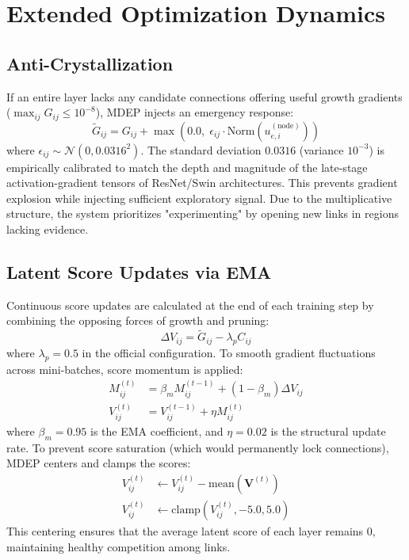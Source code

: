 \documentclass[letterpaper]{article} %
\begin{document}
\section{Extended Optimization Dynamics}
\subsection{Anti-Crystallization}\label{subsec:anti_crystal}

If an entire layer lacks any candidate connections offering useful growth gradients ($\max_{ij} G_{ij} \le 10^{-8}$), MDEP injects an emergency response:
\begin{equation}\label{eq:anti_crystal_eq}
    \tilde{G}_{ij} = G_{ij} + \max\!\left(0.0,\; \epsilon_{ij} \cdot \text{Norm}(u_{e,i}^{(\text{node})})\right)
\end{equation}
where $\epsilon_{ij} \sim \mathcal{N}(0, 0.0316^2)$. The standard deviation $0.0316$ (variance $10^{-3}$) is empirically calibrated to match the depth and magnitude of the late-stage activation-gradient tensors of ResNet/Swin architectures. This prevents gradient explosion while injecting sufficient exploratory signal. Due to the multiplicative structure, the system prioritizes "experimenting" by opening new links in regions lacking evidence.

\subsection{Latent Score Updates via EMA}\label{subsec:score_update}

Continuous score updates are calculated at the end of each training step by combining the opposing forces of growth and pruning:
\begin{equation}\label{eq:delta_V}
    \Delta V_{ij} = \tilde{G}_{ij} - \lambda_p C_{ij}
\end{equation}
where $\lambda_p=0.5$ in the official configuration.
To smooth gradient fluctuations across mini-batches, score momentum is applied:
\begin{align}
    M_{ij}^{(t)} &= \beta_m M_{ij}^{(t-1)} + (1 - \beta_m) \Delta V_{ij} \\
    V_{ij}^{(t)} &= V_{ij}^{(t-1)} + \eta M_{ij}^{(t)}
\end{align}
where $\beta_m = 0.95$ is the EMA coefficient, and $\eta = 0.02$ is the structural update rate. To prevent score saturation (which would permanently lock connections), MDEP centers and clamps the scores:
\begin{align}
    V_{ij}^{(t)} &\leftarrow V_{ij}^{(t)} - \text{mean}(\bm{V}^{(t)}) \\
    V_{ij}^{(t)} &\leftarrow \text{clamp}(V_{ij}^{(t)}, -5.0, 5.0)
\end{align}
This centering ensures that the average latent score of each layer remains 0, maintaining healthy competition among links.
\end{document}
